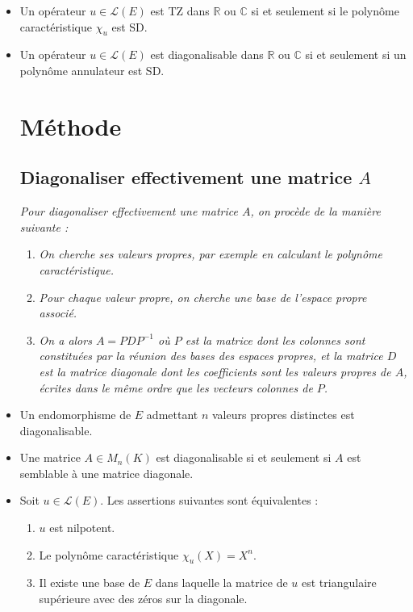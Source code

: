 \documentclass{article}
\begin{document}
\begin{itemize}[label=$\ast$]
\item Un opérateur $u \in \mathcal{L}(E)$ est TZ dans $\mathbb{R}$ ou $\mathbb{C}$ si et seulement si le polynôme caractéristique $\chi_u$ est SD.

\item Un opérateur $u \in \mathcal{L}(E)$ est diagonalisable dans $\mathbb{R}$ ou $\mathbb{C}$ si et seulement si un polynôme annulateur est SD.

\section*{Méthode}

\subsection*{Diagonaliser effectivement une matrice \( A \)}
\textit{Pour diagonaliser effectivement une matrice \( A \), on procède de la manière suivante :}

\begin{enumerate}
    \item \textit{On cherche ses valeurs propres, par exemple en calculant le polynôme caractéristique.}
    \item \textit{Pour chaque valeur propre, on cherche une base de l'espace propre associé.}
    \item \textit{On a alors \( A = PDP^{-1} \) où \( P \) est la matrice dont les colonnes sont constituées par la réunion des bases des espaces propres, et la matrice \( D \) est la matrice diagonale dont les coefficients sont les valeurs propres de \( A \), écrites dans le même ordre que les vecteurs colonnes de \( P \).}
\end{enumerate}



\item Un endomorphisme de $E$ admettant $n$ valeurs propres distinctes est diagonalisable.

\item Une matrice $A \in M_n(K)$ est diagonalisable si et seulement si $A$ est semblable à une matrice diagonale.

\item Soit $u \in \mathcal{L}(E)$. Les assertions suivantes sont équivalentes :
\begin{enumerate}
    \item $u$ est nilpotent.
    \item Le polynôme caractéristique $\chi_u(X) = X^n$.
    \item Il existe une base de $E$ dans laquelle la matrice de $u$ est triangulaire supérieure avec des zéros sur la diagonale.
\end{enumerate}


\end{itemize}
\end{document}
